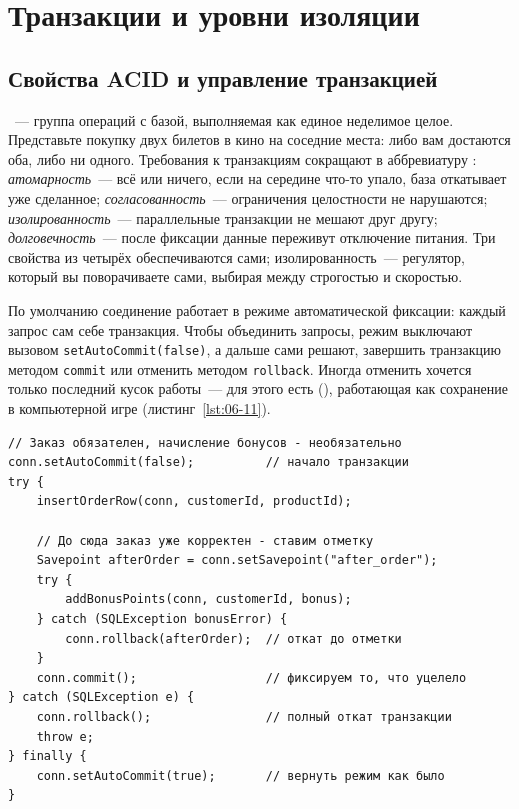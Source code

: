 \section{Транзакции и уровни изоляции}

\subsection{Свойства ACID и управление транзакцией}

~--- группа операций с базой, выполняемая как единое
неделимое целое. Представьте покупку двух билетов в кино на соседние места:
либо вам достаются оба, либо ни одного. Требования к транзакциям сокращают в
аббревиатуру : \emph{атомарность}~--- всё или ничего, если на
середине что-то упало, база откатывает уже сделанное;
\emph{согласованность}~--- ограничения целостности не нарушаются;
\emph{изолированность}~--- параллельные транзакции не мешают друг другу;
\emph{долговечность}~--- после фиксации данные переживут отключение питания.
Три свойства из четырёх обеспечиваются сами; изолированность~--- регулятор,
который вы поворачиваете сами, выбирая между строгостью и скоростью.

По умолчанию соединение работает в режиме автоматической фиксации: каждый
запрос сам себе транзакция. Чтобы объединить запросы, режим выключают вызовом
\texttt{setAutoCommit(false)}, а дальше сами решают, завершить транзакцию
методом \texttt{commit} или отменить методом \texttt{rollback}. Иногда
отменить хочется только последний кусок работы~--- для этого есть  (), работающая как сохранение в компьютерной игре
(листинг~\ref{lst:06-11}).

\begin{listing}[H]
\begin{verbatim}
// Заказ обязателен, начисление бонусов - необязательно
conn.setAutoCommit(false);          // начало транзакции
try {
    insertOrderRow(conn, customerId, productId);

    // До сюда заказ уже корректен - ставим отметку
    Savepoint afterOrder = conn.setSavepoint("after_order");
    try {
        addBonusPoints(conn, customerId, bonus);
    } catch (SQLException bonusError) {
        conn.rollback(afterOrder);  // откат до отметки
    }
    conn.commit();                  // фиксируем то, что уцелело
} catch (SQLException e) {
    conn.rollback();                // полный откат транзакции
    throw e;
} finally {
    conn.setAutoCommit(true);       // вернуть режим как было
}
\end{verbatim}
\caption{Транзакция с точкой сохранения}
\label{lst:06-11}
\end{listing}

